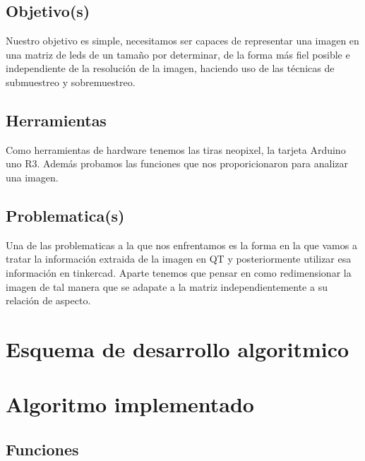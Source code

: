 \documentclass{article}
\begin{document}
    \begin{flushleft}
    \subsection{Objetivo(s)}
    Nuestro objetivo es simple, necesitamos ser capaces de representar una imagen en una matriz de leds de un tamaño por determinar, de la forma más fiel posible e independiente de la resolución de la imagen, haciendo uso de las técnicas de submuestreo y sobremuestreo. 
    \end{flushleft}
    \vspace*{0.5cm}
    \begin{flushleft}
    \subsection{Herramientas}
    Como herramientas de hardware tenemos las tiras neopixel, la tarjeta Arduino uno R3. Además probamos las funciones que nos proporicionaron para analizar una imagen. 
    \end{flushleft}
    \vspace*{0.5cm}
    \begin{flushleft}
    \subsection{Problematica(s)}
     Una de las problematicas a la que nos enfrentamos es la forma en la que vamos a tratar la información extraida de la imagen en QT y posteriormente utilizar esa información en tinkercad.
     Aparte tenemos que pensar en como redimensionar la imagen de tal manera que se adapate a la matriz independientemente a su relación de aspecto.   
    \end{flushleft}
    \vspace*{2cm}
    
\newpage  
    
\section{Esquema de desarrollo algoritmico}
\label{esquema}
    \begin{flushleft}

    \end{flushleft}
\newpage
    
\section{Algoritmo implementado}
\label{implementado}
    \begin{flushleft}
    
    \subsection{Funciones}
    \begin{flushleft}
    
    \vspace*{0.3cm}
        
    \end{flushleft}
    \end{flushleft}
    
\end{document}
